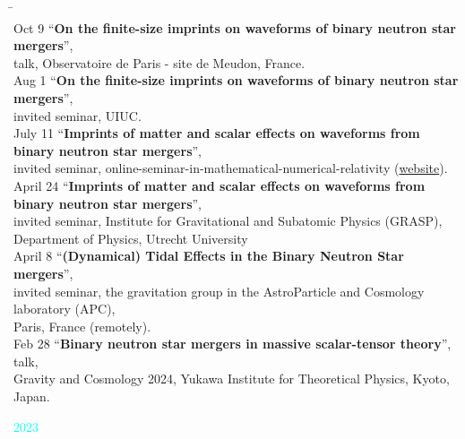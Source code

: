 \documentclass[11pt,a4paper,sans]{moderncv}
\begin{document}
\begin{tabbing}
\hspace*{2.3cm} \= \hspace*{10cm} \\[-3ex]
Oct 9 \> ``\textbf{On the finite-size imprints on waveforms of binary neutron star mergers}'',\\
\> talk, Observatoire de Paris - site de Meudon, France. \\
Aug 1 \> ``\textbf{On the finite-size imprints on waveforms of binary neutron star mergers}'',\\
\> invited seminar, UIUC. \\
July 11 \> ``\textbf{Imprints of matter and scalar effects on waveforms from binary neutron star mergers}'',\\
\>  invited seminar, online-seminar-in-mathematical-numerical-relativity (\href{https://github.com/Mathematical-Numerical-Relativity/Online-Seminar/wiki}{website}). \\
April 24 \> ``\textbf{Imprints of matter and scalar effects on waveforms from binary neutron star mergers}'',\\
\>  invited seminar, Institute for Gravitational and Subatomic Physics (GRASP), \\
\> Department of Physics, Utrecht University\\
April 8 \> ``\textbf{(Dynamical) Tidal Effects in the Binary Neutron Star mergers}'',\\
\> invited seminar, the gravitation group in the AstroParticle and Cosmology laboratory (APC),\\
\> Paris, France (remotely).\\
Feb 28 \> ``\textbf{Binary neutron star mergers in massive scalar-tensor theory}'', talk,\\
\> Gravity and Cosmology 2024, Yukawa Institute for Theoretical Physics, Kyoto, Japan.
\end{tabbing}
{\Large \textcolor{cyan}{2023}}
\end{document}

